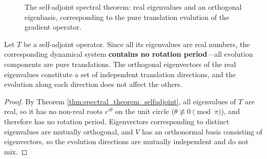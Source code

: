 \begin{figure}[htbp]
\centering
{}
\caption{The self-adjoint spectral theorem: real eigenvalues and an orthogonal eigenbasis, corresponding to the pure translation evolution of the gradient operator.}
\label{fig:selfadjoint_spectral}
\end{figure}

\begin{corollary}\label{cor:selfadjoint_conservation}
Let $T$ be a self-adjoint operator. Since all its eigenvalues are real numbers, the corresponding dynamical system \textbf{contains no rotation period}---all evolution components are pure translations. The orthogonal eigenvectors of the real eigenvalues constitute a set of independent translation directions, and the evolution along each direction does not affect the others.
\end{corollary}

\begin{proof}
By Theorem \ref{thm:spectral_theorem_selfadjoint}, all eigenvalues of $T$ are real, so it has no non-real roots $e^{i\theta}$ on the unit circle ($\theta \not\equiv 0 \pmod{\pi}$), and therefore has no rotation period. Eigenvectors corresponding to distinct eigenvalues are mutually orthogonal, and $V$ has an orthonormal basis consisting of eigenvectors, so the evolution directions are mutually independent and do not mix.
\end{proof}

